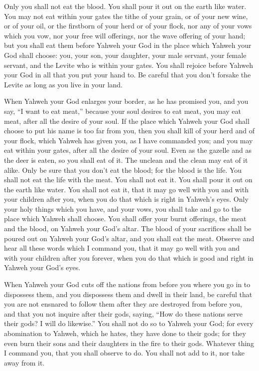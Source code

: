 {Only you shall not eat the blood. You shall pour it out on the earth like water.
You may not eat within your gates the tithe of your grain, or of your new wine, or of your oil, or the firstborn of your herd or of your flock, nor any of your vows which you vow, nor your free will offerings, nor the wave offering of your hand;
but you shall eat them before Yahweh your God in the place which Yahweh your God shall choose: you, your son, your daughter, your male servant, your female servant, and the Levite who is within your gates. You shall rejoice before Yahweh your God in all that you put your hand to.
Be careful that you don’t forsake the Levite as long as you live in your land.
\par }{\PP {}When Yahweh your God enlarges your border, as he has promised you, and you say, “I want to eat meat,” because your soul desires to eat meat, you may eat meat, after all the desire of your soul.
If the place which Yahweh your God shall choose to put his name is too far from you, then you shall kill of your herd and of your flock, which Yahweh has given you, as I have commanded you; and you may eat within your gates, after all the desire of your soul.
Even as the gazelle and as the deer is eaten, so you shall eat of it. The unclean and the clean may eat of it alike.
Only be sure that you don’t eat the blood; for the blood is the life. You shall not eat the life with the meat.
You shall not eat it. You shall pour it out on the earth like water.
You shall not eat it, that it may go well with you and with your children after you, when you do that which is right in Yahweh’s eyes.
Only your holy things which you have, and your vows, you shall take and go to the place which Yahweh shall choose.
You shall offer your burnt offerings, the meat and the blood, on Yahweh your God’s altar. The blood of your sacrifices shall be poured out on Yahweh your God’s altar, and you shall eat the meat.
Observe and hear all these words which I command you, that it may go well with you and with your children after you forever, when you do that which is good and right in Yahweh your God’s eyes.
\par }{\PP {}When Yahweh your God cuts off the nations from before you where you go in to dispossess them, and you dispossess them and dwell in their land,
be careful that you are not ensnared to follow them after they are destroyed from before you, and that you not inquire after their gods, saying, “How do these nations serve their gods? I will do likewise.”
You shall not do so to Yahweh your God; for every abomination to Yahweh, which he hates, they have done to their gods; for they even burn their sons and their daughters in the fire to their gods.
Whatever thing I command you, that you shall observe to do. You shall not add to it, nor take away from it.

}
